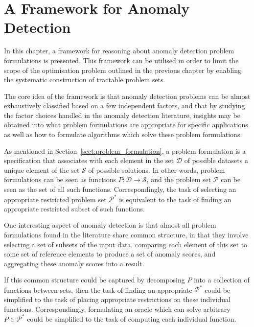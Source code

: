 \chapter{A Framework for Anomaly Detection}
\label{ch:framework}

In this chapter, a framework for reasoning about anomaly detection problem formulations is presented. This framework can be utilised in order to limit the scope of the optimisation problem outlined in the previous chapter by enabling the systematic construction of tractable problem sets.

The core idea of the framework is that anomaly detection problems can be almost exhaustively classified based on a few independent factors, and that by studying the factor choices handled in the anomaly detection literature, insights may be obtained into what problem formulations are appropriate for specific applications as well as how to formulate algorithms which solve these problem formulations.

As mentioned in Section~\ref{sect:problem_formulation}, a problem formulation is a specification that associates with each element in the set $\mathcal{D}$ of possible datasets a unique element of the set $\mathcal{S}$ of possible solutions. In other words, problem formulations can be seen as functions $P: \mathcal{D} \rightarrow \mathcal{S}$, and the problem set $\mathcal{P}$ can be seen as the set of all such functions. Correspondingly, the task of selecting an appropriate restricted problem set $\mathcal{P}^*$ is equivalent to the task of finding an appropriate restricted subset of such functions.

One interesting aspect of anomaly detection is that almost all problem formulations found in the literature share common structure, in that they involve selecting a set of subsets of the input data, comparing each element of this set to some set of reference elements to produce a set of anomaly scores, and aggregating these anomaly scores into a result.

If this common structure could be captured by decomposing $P$ into a collection of functions between sets, then the task of finding an appropriate $\mathcal{P}^*$ could be simplified to the task of placing appropriate restrictions on these individual functions. Correspondingly, formulating an oracle which can solve arbitrary $P \in \mathcal{P}^*$ could be simplified to the task of computing each individual function.

